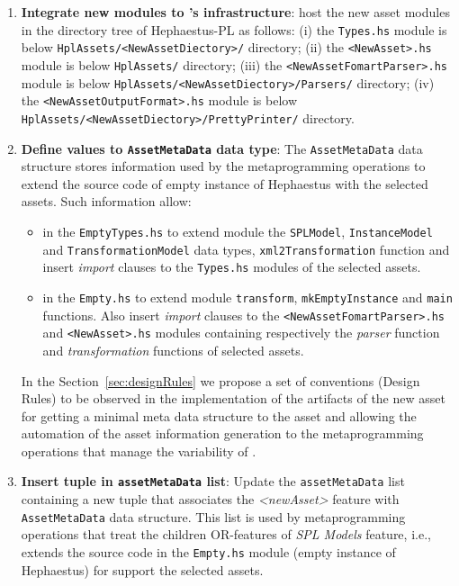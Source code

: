 \begin{enumerate}
  \item \textbf{Integrate new modules to \hpl's infrastructure}: host the new asset modules in the directory tree of Hephaestus-PL as follows: (i) the \texttt{Types.hs} module is below \texttt{HplAssets/<NewAssetDiectory>/} directory; (ii) the \texttt{<NewAsset>.hs} module is below \texttt{HplAssets/} directory; (iii) the \texttt{<NewAssetFomartParser>.hs} module is below \texttt{HplAssets/<NewAssetDiectory>/Parsers/} directory; (iv) the \texttt{<NewAssetOutputFormat>.hs} module  is below \texttt{HplAssets/<NewAssetDiectory>/PrettyPrinter/} directory.

  \item \textbf{Define values to \texttt{AssetMetaData} data type}: The \texttt{AssetMetaData} data structure stores information used by the metaprogramming operations to extend the source code of empty instance of Hephaestus with the selected assets. Such information allow:

\begin{itemize}

\item in the \texttt{EmptyTypes.hs} to extend module the \texttt{SPLModel}, \texttt{InstanceModel} and \texttt{TransformationModel} data types, \texttt{xml2Transformation} function and insert \textit{import} clauses to the \texttt{Types.hs} modules of the selected assets.

\item in the \texttt{Empty.hs} to extend module \texttt{transform}, \texttt{mkEmptyInstance} and \texttt{main} functions. Also insert \textit{import} clauses to the  \texttt{<NewAssetFomartParser>.hs} and  \texttt{<NewAsset>.hs} modules containing respectively the \textit{parser} function and \textit{transformation} functions of selected assets.

\end{itemize}

In the Section~\ref{sec:designRules} we propose a set of conventions (Design Rules) to be observed in the implementation of the artifacts of the new asset for getting a minimal meta data structure to the asset and allowing the automation of the asset information generation to the metaprogramming operations that manage the variability of \hpl.

  \item \textbf{Insert tuple in \texttt{assetMetaData} list}: Update the \texttt{assetMetaData} list containing a new tuple that associates the \textit{<newAsset>} feature with \texttt{AssetMetaData} data structure. This list is used by metaprogramming operations that treat the children OR-features of \textit{SPL Models} feature, i.e., extends the source code in the \texttt{Empty.hs} module (empty instance of Hephaestus) for support the selected assets.


\end{enumerate}
